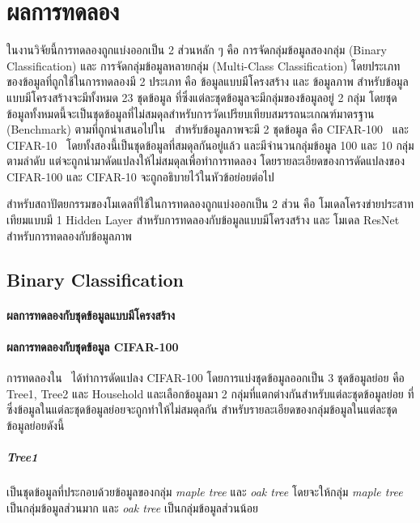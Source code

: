 \chapter{ผลการทดลอง}
\label{chapter:result}

ในงานวิจัยนี้การทดลองถูกแบ่งออกเป็น 2 ส่วนหลัก ๆ คือ การจัดกลุ่มข้อมูลสองกลุ่ม (Binary Classification) และ การจัดกลุ่มข้อมูลหลายกลุ่ม (Multi-Class Classification) โดยประเภทของข้อมูลที่ถูกใช้ในการทดลองมี 2 ประเภท คือ ข้อมูลแบบมีโครงสร้าง และ ข้อมูลภาพ สำหรับข้อมูลแบบมีโครงสร้างจะมีทั้งหมด 23 ชุดข้อมูล ที่ซึ่งแต่ละชุดข้อมูลจะมีกลุ่มของข้อมูลอยู่ 2 กลุ่ม โดยชุดข้อมูลทั้งหมดนี้จะเป็นชุดข้อมูลที่ไม่สมดุลสำหรับการวัดเปรียบเทียบสมรรถนะเกณฑ์มาตรฐาน (Benchmark) ตามที่ถูกนำเสนอไปใน~\cite{Ding:2011} สำหรับข้อมูลภาพจะมี 2 ชุดข้อมูล คือ CIFAR-100~\cite{Krizhevsky:2009} และ CIFAR-10~\cite{Krizhevsky:2009} โดยทั้งสองนี้เป็นชุดข้อมูลที่สมดุลกันอยู่แล้ว และมีจำนวนกลุ่มข้อมูล 100 และ 10 กลุ่มตามลำดับ แต่จะถูกนำมาดัดแปลงให้ไม่สมดุลเพื่อทำการทดลอง โดยรายละเอียดของการดัดแปลงของ CIFAR-100 และ CIFAR-10 จะถูกอธิบายไว้ในหัวข้อย่อยต่อไป

สำหรับสถาปัตยกรรมของโมเดลที่ใช้ในการทดลองถูกแบ่งออกเป็น 2 ส่วน คือ โมเดลโครงข่ายประสาทเทียมแบบมี 1 Hidden Layer สำหรับการทดลองกับข้อมูลแบบมีโครงสร้าง และ โมเดล ResNet~\citep{He:2016} สำหรับการทดลองกับข้อมูลภาพ

\section{Binary Classification}
\subsubsection{ผลการทดลองกับชุดข้อมูลแบบมีโครงสร้าง}
\subsubsection{ผลการทดลองกับชุดข้อมูล CIFAR-100}
การทดลองใน~\cite{Wang:2016} ได้ทำการดัดแปลง CIFAR-100 โดยการแบ่งชุดข้อมูลออกเป็น 3 ชุดข้อมูลย่อย คือ Tree1, Tree2 และ Household และเลือกข้อมูลมา 2 กลุ่มที่แตกต่างกันสำหรับแต่ละชุดข้อมูลย่อย ที่ซึ่งข้อมูลในแต่ละชุดข้อมูลย่อยจะถูกทำให้ไม่สมดุลกัน สำหรับรายละเอียดของกลุ่มข้อมูลในแต่ละชุดข้อมูลย่อยดังนี้

\paragraph{Tree1}
เป็นชุดข้อมูลที่ประกอบด้วยข้อมูลของกลุ่ม \emph{maple tree} และ \emph{oak tree} โดยจะให้กลุ่ม \emph{maple tree} เป็นกลุ่มข้อมูลส่วนมาก และ \emph{oak tree} เป็นกลุ่มข้อมูลส่วนน้อย

